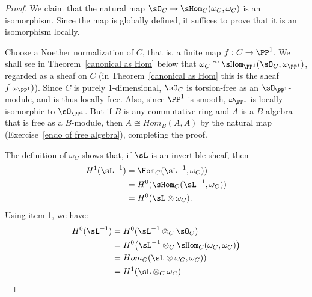 \begin{proof}
 We claim that the natural map $\sO_C \to \sHom_C(\omega_C, \omega_C)$ is an isomorphism.
Since the map is globally defined, it suffices to prove that it is an isomorphism locally. 

Choose a Noether
normalization of $C$, that is, a finite map $f: C\to \PP^1$. 
We shall see in Theorem~\ref{canonical as Hom} below that $\omega_C \cong \sHom_{\PP^1}(\sO_C,\omega_{\PP^1})$, regarded as a sheaf on $C$ (in Theorem~\ref{canonical as Hom} this is the sheaf $f^{!}\omega_{\PP^{1}})$).
Since $C$ is purely 1-dimensional, $\sO_{C}$ is torsion-free as an $\sO_{\PP^{1}}$-module, and is thus locally 
free. 
%
Also, since $\PP^{1}$ is smooth, $\omega_{\PP^{1}}$ is locally
isomorphic to $\sO_{\PP^{1}}$.
But if $B$ is any commutative ring and $A$ is a $B$-algebra that is free as a $B$-module, then
$A\cong Hom_{B}(A,A)$ by the natural map (Exercise~\ref{endo of free algebra}),
completing the proof.


 The definition of $\omega_C$ shows that, if $\sL$ is an invertible sheaf, then
$$
\begin{aligned}
H^1(\sL^{-1}) &= \Hom_C(\sL^{-1}, \omega_C))\\
&= H^0(\sHom_C(\sL^{-1}, \omega_C))\\
&= H^0(\sL\otimes \omega_{C}).
\end{aligned}
$$
Using item 1, we have:
$$
\begin{aligned}
H^0 (\sL^{-1})
&= H^0 (\sL^{-1}\otimes_{C}\sO_{C})\\
&= H^0 \bigl(\sL^{-1}\otimes_{C}\sHom_C(\omega_{C}, \omega_{C})\bigr) \\
&= Hom_{C}(\sL\otimes \omega_{C},  \omega_{C}))\\
&= H^{1}(\sL\otimes_{C}\omega_{C}) 
%
%
\end{aligned}
$$
 \end{proof}


